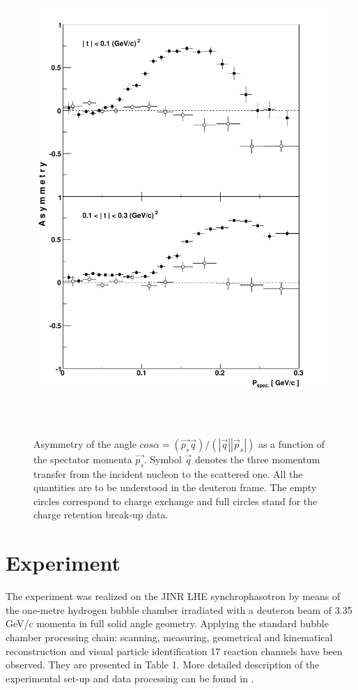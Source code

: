 \documentclass[a4paper,12pt]{article}
\begin{document}
\begin{figure}[hbp]
  \begin{center}
    \includegraphics[angle=0,height=18cm]{fig_asym.pdf}
    \caption {Asymmetry of the angle
      $ cos \alpha = (\vec {p_s} \vec {q})/({|\vec q|  |\vec p_{s}|}) $ as a
      function of the spectator momenta $\vec{p_s}$. Symbol  $\vec{q}$ denotes
      the three momentum transfer from the incident nucleon to the scattered
      one. All the quantities are to be understood in the deuteron frame.  The
      empty circles correspond to charge exchange and full circles stand for the
      charge retention break-up data.}
    \label{f_asym}
  \end{center}
\end{figure}

\section{Experiment}
The experiment was realized on the JINR LHE synchrophasotron by means of the
one-metre hydrogen bubble  chamber irradiated with a deuteron beam of 3.35 GeV/c
momenta in full solid angle geometry. Applying the standard bubble chamber
processing chain: scanning, measuring, geometrical and kinematical
reconstruction and visual particle identification 17 reaction channels have been
observed. They are presented in Table 1. More detailed description of the
experimental set-up and data processing can be found in \cite {a16}.
\end{document}

